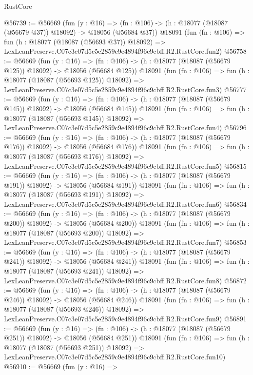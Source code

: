 \begin{lexlean}{RustCore}
\begin{coremodule}
@56739 := @56669
    (fun (y : @16) =>
    (fn : @106) -> (h : @18077 (@18087 (@56679 @37)) @18092) -> @18056 (@56684 @37))
    @18091
    (fun (fn : @106) =>
    fun (h : @18077 (@18087 (@56693 @37)) @18092) =>
    LexLeanPreserve.C07c3e07d5c5e2859c9e4894f96c9cbff.R2.RustCore.fun2)
@56758 := @56669
    (fun (y : @16) =>
    (fn : @106) -> (h : @18077 (@18087 (@56679 @125)) @18092) -> @18056 (@56684 @125))
    @18091
    (fun (fn : @106) =>
    fun (h : @18077 (@18087 (@56693 @125)) @18092) =>
    LexLeanPreserve.C07c3e07d5c5e2859c9e4894f96c9cbff.R2.RustCore.fun3)
@56777 := @56669
    (fun (y : @16) =>
    (fn : @106) -> (h : @18077 (@18087 (@56679 @145)) @18092) -> @18056 (@56684 @145))
    @18091
    (fun (fn : @106) =>
    fun (h : @18077 (@18087 (@56693 @145)) @18092) =>
    LexLeanPreserve.C07c3e07d5c5e2859c9e4894f96c9cbff.R2.RustCore.fun4)
@56796 := @56669
    (fun (y : @16) =>
    (fn : @106) -> (h : @18077 (@18087 (@56679 @176)) @18092) -> @18056 (@56684 @176))
    @18091
    (fun (fn : @106) =>
    fun (h : @18077 (@18087 (@56693 @176)) @18092) =>
    LexLeanPreserve.C07c3e07d5c5e2859c9e4894f96c9cbff.R2.RustCore.fun5)
@56815 := @56669
    (fun (y : @16) =>
    (fn : @106) -> (h : @18077 (@18087 (@56679 @191)) @18092) -> @18056 (@56684 @191))
    @18091
    (fun (fn : @106) =>
    fun (h : @18077 (@18087 (@56693 @191)) @18092) =>
    LexLeanPreserve.C07c3e07d5c5e2859c9e4894f96c9cbff.R2.RustCore.fun6)
@56834 := @56669
    (fun (y : @16) =>
    (fn : @106) -> (h : @18077 (@18087 (@56679 @200)) @18092) -> @18056 (@56684 @200))
    @18091
    (fun (fn : @106) =>
    fun (h : @18077 (@18087 (@56693 @200)) @18092) =>
    LexLeanPreserve.C07c3e07d5c5e2859c9e4894f96c9cbff.R2.RustCore.fun7)
@56853 := @56669
    (fun (y : @16) =>
    (fn : @106) -> (h : @18077 (@18087 (@56679 @241)) @18092) -> @18056 (@56684 @241))
    @18091
    (fun (fn : @106) =>
    fun (h : @18077 (@18087 (@56693 @241)) @18092) =>
    LexLeanPreserve.C07c3e07d5c5e2859c9e4894f96c9cbff.R2.RustCore.fun8)
@56872 := @56669
    (fun (y : @16) =>
    (fn : @106) -> (h : @18077 (@18087 (@56679 @246)) @18092) -> @18056 (@56684 @246))
    @18091
    (fun (fn : @106) =>
    fun (h : @18077 (@18087 (@56693 @246)) @18092) =>
    LexLeanPreserve.C07c3e07d5c5e2859c9e4894f96c9cbff.R2.RustCore.fun9)
@56891 := @56669
    (fun (y : @16) =>
    (fn : @106) -> (h : @18077 (@18087 (@56679 @251)) @18092) -> @18056 (@56684 @251))
    @18091
    (fun (fn : @106) =>
    fun (h : @18077 (@18087 (@56693 @251)) @18092) =>
    LexLeanPreserve.C07c3e07d5c5e2859c9e4894f96c9cbff.R2.RustCore.fun10)
@56910 := @56669
    (fun (y : @16) =>

\end{coremodule}
\end{lexlean}
